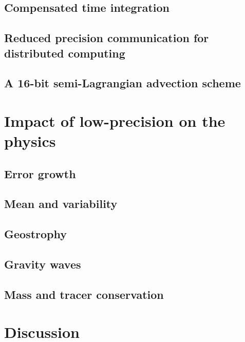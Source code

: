 \subsection{Compensated time integration}
\subsection{Reduced precision communication for distributed computing}
\subsection{A 16-bit semi-Lagrangian advection scheme}

\section{Impact of low-precision on the physics}
\subsection{Error growth}
\subsection{Mean and variability}
\subsection{Geostrophy}
\subsection{Gravity waves}
\subsection{Mass and tracer conservation}

\section{Discussion}